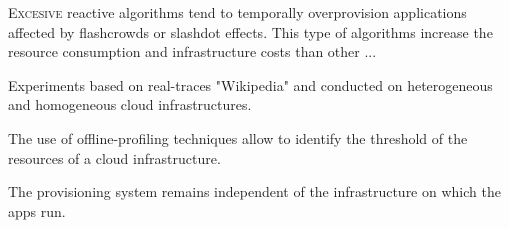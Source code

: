 

\lettrine{E}{xcesive} reactive algorithms tend to temporally overprovision applications affected by flashcrowds or slashdot effects. This type of algorithms increase the resource consumption and infrastructure costs than other ...

Experiments based on real-traces "Wikipedia" and conducted on heterogeneous and homogeneous cloud infrastructures. 

The use of offline-profiling techniques allow to identify the threshold of the resources of a cloud infrastructure. 

The provisioning system remains independent of the infrastructure on which the apps run.

